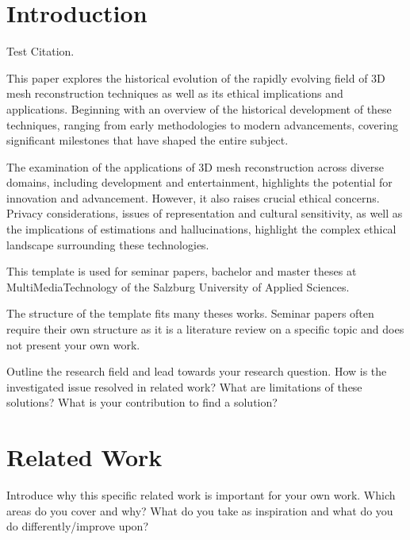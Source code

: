 

\section{Introduction}
\label{section:Introduction}

\textcite[]{kerr_lerf_2023} Test Citation.

This paper explores the historical evolution of the rapidly evolving field of 3D mesh reconstruction techniques as well as its ethical implications and applications.
Beginning with an overview of the historical development of these techniques, ranging from early methodologies to modern advancements, covering significant milestones that have shaped the entire subject.

The examination of the applications of 3D mesh reconstruction across diverse domains, including development and entertainment, highlights the potential for innovation and advancement. However, it also raises crucial ethical concerns. Privacy considerations, issues of representation and cultural sensitivity, as well as the implications of estimations and hallucinations, highlight the complex ethical landscape surrounding these technologies.


This template is used for seminar papers, bachelor and master theses at MultiMediaTechnology of the Salzburg University of Applied Sciences.

The structure of the template fits many theses works. Seminar papers often require their own structure as it is a literature review on a specific topic and does not present your own work.

Outline the research field and lead towards your research question. How is the investigated issue resolved in related work? What are limitations of these solutions? What is your contribution to find a solution?

\section{Related Work}
Introduce why this specific related work is important for your own work. Which areas do you cover and why? What do you take as inspiration and what do you do differently/improve upon?


